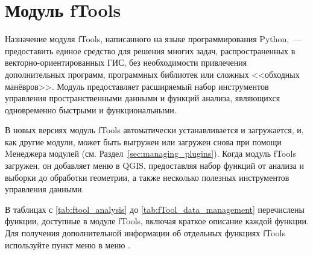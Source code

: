 
\section{Модуль fTools}\label{sec:ftools}


Назначение модуля fTools, написанного на языке программирования
Python,~--- предоставить единое средство для решения многих задач,
распространенных в векторно-ориентированных
ГИС, без необходимости привлечения дополнительных программ, программных
библиотек или сложных <<обходных манёвров>>. Модуль предоставляет расширяемый
набор инструментов управления пространственными данными и функций анализа,
являющихся одновременно быстрыми и функциональными.

В новых версиях \qg модуль fTools автоматически устанавливается и загружается,
и, как другие модули, может быть выгружен или загружен снова при помощи
Mенеджера модулей (см. Раздел~\ref{sec:managing_plugins}). Когда модуль
fTools загружен, он добавляет меню  в QGIS, предоставляя
набор функций от анализа и выборки до обработки геометрии, а также несколько
полезных инструментов управления данными.

\label{ftool_functions}

В таблицах с \ref{tab:ftool_analysis} до \ref{tab:fTool_data_management}
перечислены функции, доступные в модуле fTools, включая краткое описание
каждой функции. Для получения дополнительной информации об отдельных
функциях fTools используйте пункт меню 
в меню .

